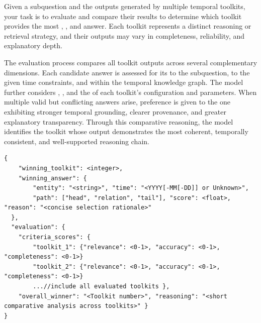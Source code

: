 \vspace{6mm}

\begin{center}
\begin{minipage}{0.9\columnwidth}
    \vspace{2mm}
    \centering
    \begin{tcolorbox}[title=Multiple Toolkits Debate–Vote Prompt Template]
        \small



Given a subquestion and the outputs generated by multiple temporal toolkits, your task is to evaluate and compare their results to determine which toolkit provides the most , , and  answer. 
Each toolkit represents a distinct reasoning or retrieval strategy, and their outputs may vary in completeness, reliability, and explanatory depth.

The evaluation process compares all toolkit outputs across several complementary dimensions.  
Each candidate answer is assessed for its  to the subquestion,  to the given time constraints, and  within the temporal knowledge graph.  
The model further considers , , and the  of each toolkit’s configuration and parameters.  
When multiple valid but conflicting answers arise, preference is given to the one exhibiting stronger temporal grounding, clearer provenance, and greater explanatory transparency.  
Through this comparative reasoning, the model identifies the toolkit whose output demonstrates the most coherent, temporally consistent, and well-supported reasoning chain.




\begin{verbatim}
{
    "winning_toolkit": <integer>,
    "winning_answer": {
        "entity": "<string>", "time": "<YYYY[-MM[-DD]] or Unknown>",
        "path": ["head", "relation", "tail"], "score": <float>, "reason": "<concise selection rationale>"
  },
  "evaluation": { 
    "criteria_scores": {
        "toolkit_1": {"relevance": <0-1>, "accuracy": <0-1>, "completeness": <0-1>} 
        "toolkit_2": {"relevance": <0-1>, "accuracy": <0-1>, "completeness": <0-1>} 
        ...//include all evaluated toolkits },
    "overall_winner": "<Toolkit number>", "reasoning": "<short comparative analysis across toolkits>" }
}
\end{verbatim}


\end{tcolorbox}
\end{minipage}
\end{center}
